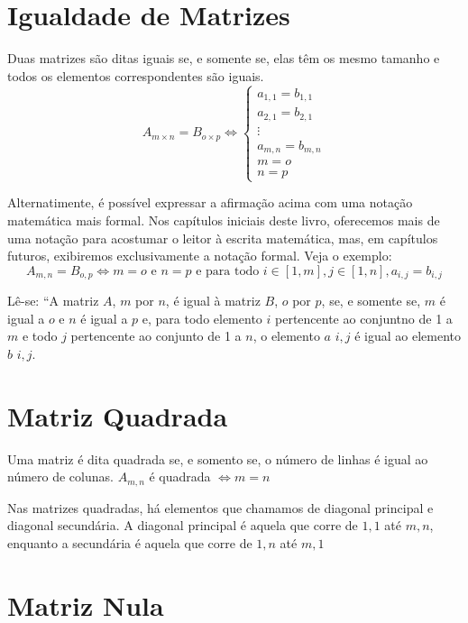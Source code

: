 \documentclass[
  portuguese,
  letterpaper,
  DIV=11,
  numbers=noendperiod]{scrreport}
\begin{document}
\section{Igualdade de Matrizes}\label{igualdade-de-matrizes}

Duas matrizes são ditas iguais se, e somente se, elas têm os mesmo
tamanho e todos os elementos correspondentes são iguais. \[
A_{m\times n} = B_{o\times p} \Leftrightarrow
\begin{cases}
    a_{1,1} = b_{1,1} \\
    a_{2,1} = b_{2,1} \\
    \vdots  \\
    a_{m,n} = b_{m,n}\\
    m = o \\
    n = p
\end{cases}
\]

Alternatimente, é possível expressar a afirmação acima com uma notação
matemática mais formal. Nos capítulos iniciais deste livro, oferecemos
mais de uma notação para acostumar o leitor à escrita matemática, mas,
em capítulos futuros, exibiremos exclusivamente a notação formal. Veja o
exemplo: \[
A_{m,n} = B_{o,p} \Leftrightarrow m=o \text{ e }  n=p \text{ e para todo }  i \in [1,m], j \in [1,n],  a_{i,j} = b_{i,j}
\]

Lê-se: ``A matriz \(A\), \(m\) por \(n\), é igual à matriz \(B\), \(o\)
por \(p\), se, e somente se, \(m\) é igual a \(o\) e \(n\) é igual a
\(p\) e, para todo elemento \(i\) pertencente ao conjuntno de 1 a \(m\)
e todo \(j\) pertencente ao conjunto de 1 a \(n\), o elemento \(a\)
\(i,j\) é igual ao elemento \(b\) \(i,j\).

\section{Matriz Quadrada}\label{matriz-quadrada}

Uma matriz é dita quadrada se, e somento se, o número de linhas é igual
ao número de colunas. \(A_{m,n}\) é quadrada \(\Leftrightarrow m=n\)

Nas matrizes quadradas, há elementos que chamamos de diagonal principal
e diagonal secundária. A diagonal principal é aquela que corre de
\(1,1\) até \(m,n\), enquanto a secundária é aquela que corre de \(1,n\)
até \(m,1\)

\section{Matriz Nula}\label{matriz-nula}
\end{document}
